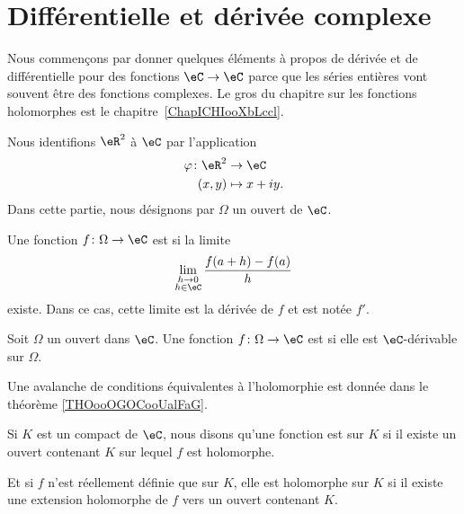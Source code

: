 \section{Différentielle et dérivée complexe}
\label{SECooJWNOooOgMiWR}

\begin{normaltext}
	Nous commençons par donner quelques éléments à propos de dérivée et de différentielle pour des fonctions \( \eC\to \eC\) parce que les séries entières vont souvent être des fonctions complexes. Le gros du chapitre sur les fonctions holomorphes est le chapitre~\ref{ChapICHIooXbLccl}.
\end{normaltext}

Nous identifions \( \eR^2\) à \( \eC\) par l'application
\begin{equation}
	\begin{aligned}
		\varphi\colon \eR^2 & \to \eC       \\
		(x,y)               & \mapsto x+iy.
	\end{aligned}
\end{equation}
Dans cette partie, nous désignons par \( \Omega\) un ouvert de \( \eC\).

\begin{definition}      \label{DEFooVJVXooKlnFkh}
	Une fonction \( f\colon \Omega\to \eC\) est  si la limite
	\begin{equation}
		\lim_{\substack{h\to0\\h\in \eC}} \frac{ f(a+h)-f(a) }{ h }
	\end{equation}
	existe. Dans ce cas, cette limite est la dérivée de \( f\) et est notée \( f'\).
\end{definition}

\begin{definition}  \label{DefMMpjJZ}
	Soit \( \Omega\) un ouvert dans \( \eC\). Une fonction \( f\colon \Omega\to \eC\) est  si elle est \( \eC\)-dérivable sur \( \Omega\).
\end{definition}

Une avalanche de conditions équivalentes à l'holomorphie est donnée dans le théorème \ref{THOooOGOCooUalFaG}.

\begin{definition}      \label{DEFooQSMCooOoWVZk}
	Si \( K\) est un compact de \( \eC\), nous disons qu'une fonction est  sur \( K\) si il existe un ouvert contenant \( K\) sur lequel \( f\) est holomorphe.

	Et si \( f\) n'est réellement définie que sur \( K\), elle est holomorphe sur \( K\) si il existe une extension holomorphe de \( f\) vers un ouvert contenant \( K\).
\end{definition}


